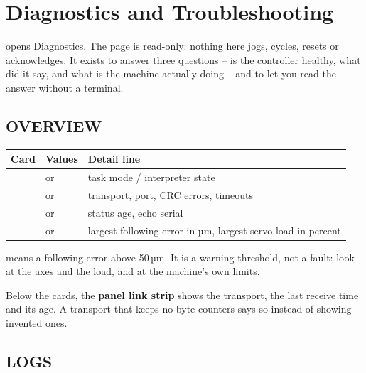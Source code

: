 \chapter{Diagnostics and Troubleshooting}
\label{ch:diagnostics}

 opens Diagnostics. The page is read-only: nothing here jogs, cycles,
resets or acknowledges. It exists to answer three questions -- is the controller healthy, what
did it say, and what is the machine actually doing -- and to let you read the answer without a
terminal.


\section{OVERVIEW}

\begin{center}
\begin{tabular}{L{3.0cm}L{5.0cm}L{5.0cm}}
  \toprule
  \textbf{Card} & \textbf{Values} & \textbf{Detail line} \\
  \midrule
   &  or  & task mode / interpreter state \\
   &  or  & transport, port, CRC errors,
        timeouts \\
   &  or  & status age, echo serial \\
   &  or  & largest following error in µm,
        largest servo load in percent \\
  \bottomrule
\end{tabular}
\end{center}

 means a following error above 50\,µm. It is a warning threshold, not a fault:
look at the axes and the load, and at the machine's own limits.

Below the cards, the \textbf{panel link strip} shows the transport, the last receive time and
its age. A transport that keeps no byte counters says so instead of showing invented ones.

\section{LOGS}

